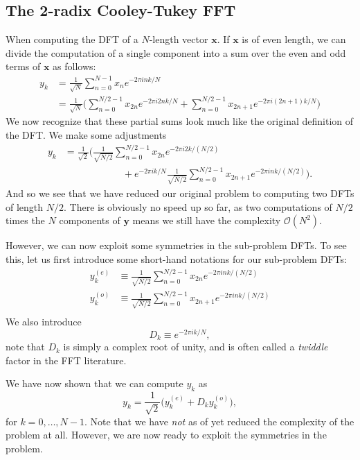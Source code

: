 \documentclass[a4paper, 11pt, notitlepage, english]{article}
\newcommand{\bt}[1]{\boldsymbol{#1}}
\begin{document}
\subsection*{The 2-radix Cooley-Tukey FFT}
When computing the DFT of a $N$-length vector $\bt{x}$. If $\bt{x}$ is of even length, we can divide the computation of a single component into a sum over the even and odd terms of $\bt{x}$ as follows:
\begin{align*}
y_k &= \frac{1}{\sqrt{N}}\sum_{n=0}^{N-1} x_n e^{-2\pi i nk /N} \\
&= \frac{1}{\sqrt{N}}\bigg(\sum_{n=0}^{N/2-1} x_{2n} e^{-2\pi i 2nk /N} + \sum_{n=0}^{N/2-1} x_{2n+1} e^{-2\pi i (2n+1)k /N}\bigg)
\end{align*}
We now recognize that these partial sums look much like the original definition of the DFT. We make some adjustments
\begin{align*}
y_k &= \frac{1}{\sqrt{2}}\bigg(\frac{1}{\sqrt{N/2}}\sum_{n=0}^{N/2-1} x_{2n} e^{-2\pi i 2k /(N/2)} \\ 
&\qquad\qquad\qquad + e^{-2\pi i k/N} \frac{1}{\sqrt{N/2}}\sum_{n=0}^{N/2-1} x_{2n+1} e^{-2\pi i nk /(N/2)}\bigg).
\end{align*}
And so we see that we have reduced our original problem to computing two DFTs of length $N/2$. There is obviously no speed up so far, as two computations of $N/2$ times the $N$ components of $\bt{y}$ means we still have the complexity $\mathcal{O}(N^2)$.

However, we can now exploit some symmetries in the sub-problem DFTs. To see this, let us first introduce some short-hand notations for our sub-problem DFTs:
\begin{align*}
y_k^{(e)} &\equiv \frac{1}{\sqrt{N/2}}\sum_{n=0}^{N/2-1} x_{2n} e^{-2\pi i nk /(N/2)} \\
y_k^{(o)} &\equiv \frac{1}{\sqrt{N/2}}\sum_{n=0}^{N/2-1} x_{2n+1} e^{-2\pi i nk /(N/2)} \\
\end{align*}
We also introduce
$$D_k \equiv e^{-2\pi i k/N},$$
note that $D_k$ is simply a complex root of unity, and is often called a \emph{twiddle} factor in the FFT literature.

We have now shown that we can compute $y_k$ as
$$y_k = \frac{1}{\sqrt{2}}\bigg(y_k^{(e)} + D_k y_k^{(o)}\bigg),$$
for $k=0, \ldots, N-1$. Note that we have \emph{not} as of yet reduced the complexity of the problem at all. However, we are now ready to exploit the symmetries in the problem.
\end{document}
